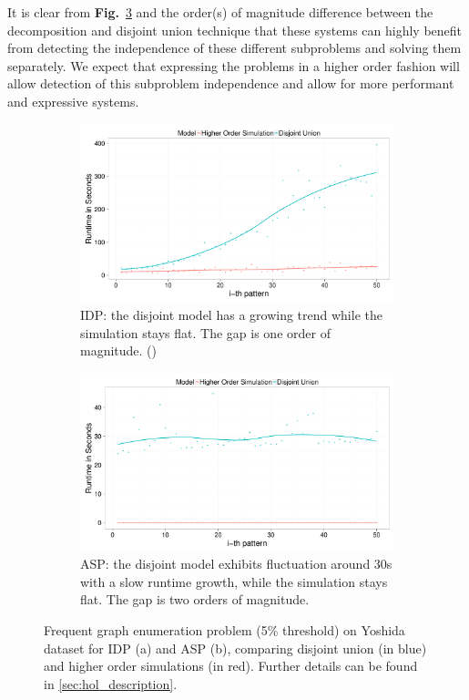 It is clear from \textbf{Fig.}~\ref{fig:decomposition_fol} and the order(s) of magnitude difference between the decomposition and disjoint union technique that these systems can highly benefit from detecting the independence of these different subproblems and solving them separately.
We expect that expressing the problems in a higher order fashion will allow detection of this subproblem independence and allow for more performant and expressive systems.
\begin{figure}[thb]
\centering
\begin{subfigure}{.44\textwidth}
  \centering
\includegraphics[scale=0.14]{extra/figure_comparison_yoshida.pdf}
\caption{\footnotesize{IDP: the disjoint model has a growing trend while the simulation stays flat. The gap is one order of magnitude. (\cite{ilp_graph_mining})}}
  \label{fig:decomposition_idp}
\end{subfigure}%
\hfill
\begin{subfigure}{0.46\textwidth}
  \centering
 \includegraphics[scale=0.14]{extra/asp_fol_vs_decomposed_yoshida.pdf}
 \caption{\footnotesize{ASP: the disjoint model exhibits fluctuation around 30s with a slow runtime growth, while the simulation stays flat. The gap is two orders of magnitude.}}
  \label{fig:decomposition_asp}
\end{subfigure}
\caption{\footnotesize{Frequent graph enumeration problem (5\% threshold) on Yoshida dataset for IDP (a) and ASP (b), comparing disjoint union (in blue) and higher order simulations (in red). Further details can be found in \ref{sec:hol_description}.}}
\label{fig:decomposition_fol}
\end{figure}

